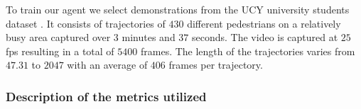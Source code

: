 To train our agent we select demonstrations from the UCY university students dataset \cite{lerner_crowds_by_example_2007}. It consists of trajectories of $430$ different pedestrians on a relatively busy area captured over $3$ minutes and $37$ seconds. The video is captured at $25$ fps resulting in a total of $5400$ frames. The length of the trajectories varies from $47.31$  to $2047$ with an average of $406$ frames per trajectory. 

%            

\subsubsection*{Description of the metrics utilized}
%

